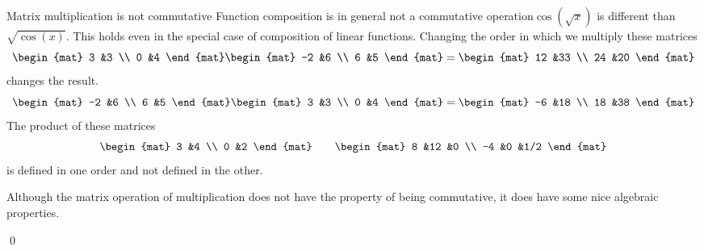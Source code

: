 \documentclass[10pt,t]{beamer}
\begin{document}
\begin{frame}{Matrix multiplication is not commutative}
Function composition is in general not a commutative 
operation\Dash $\cos(\sqrt{x})$
is different than $\sqrt{\cos(x)}$.
This holds even in the special case of 
composition of linear functions.
\pause
\ex
Changing the order in which we multiply these matrices
\begin{equation*}
  \begin{mat}
    3  &3  \\
    0  &4
  \end{mat}
  \begin{mat}
    -2  &6  \\
    6   &5
  \end{mat}
  =
  \begin{mat}
    12  &33 \\
    24  &20
  \end{mat}
\end{equation*}
changes the result.
\begin{equation*}
  \begin{mat}
    -2  &6  \\
    6   &5
  \end{mat}
  \begin{mat}
    3  &3  \\
    0  &4
  \end{mat}
  =
  \begin{mat}
     -6  &18   \\
     18  &38  
  \end{mat}
\end{equation*}
\pause
\ex
The product of these matrices
\begin{equation*}
  \begin{mat}
    3  &4  \\
    0  &2
  \end{mat}
  \qquad
  \begin{mat}
    8  &12  &0 \\
   -4  &0  &1/2
  \end{mat}
\end{equation*}
is defined in one order and not defined in the other.
\end{frame}




\begin{frame}
Although the matrix operation of multiplication does not have
the property of being commutative,
it does have some nice algebraic properties.  

\th[th:MatMultWellBehaved]
\pause
\pf
{}

\pause
{}
\qed
\end{frame}
\end{document}
